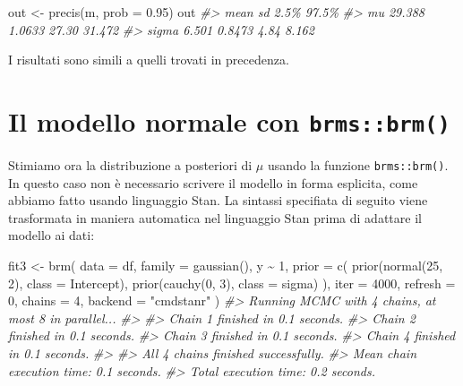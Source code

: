 \documentclass[
  11pt,
]{krantz}
\makeatletter
\newenvironment{Shaded}{\begin{snugshade}}{\end{snugshade}}
\newcommand{\AttributeTok}[1]{\textcolor[rgb]{0.61,0.61,0.61}{#1}}
\newcommand{\CommentTok}[1]{\textcolor[rgb]{0.37,0.37,0.37}{\textit{#1}}}
\newcommand{\DecValTok}[1]{\textcolor[rgb]{0.06,0.06,0.06}{#1}}
\newcommand{\FloatTok}[1]{\textcolor[rgb]{0.06,0.06,0.06}{#1}}
\newcommand{\FunctionTok}[1]{\textcolor[rgb]{0,0,0}{#1}}
\newcommand{\NormalTok}[1]{#1}
\newcommand{\OtherTok}[1]{\textcolor[rgb]{0.37,0.37,0.37}{#1}}
\newcommand{\SpecialCharTok}[1]{\textcolor[rgb]{0,0,0}{#1}}
\newcommand{\StringTok}[1]{\textcolor[rgb]{0.5,0.5,0.5}{#1}}
\newenvironment{kframe}{%
\medskip{}
\setlength{\fboxsep}{.8em}
 \def\at@end@of@kframe{}%
 \ifinner\ifhmode%
  \def\at@end@of@kframe{\end{minipage}}%
  \begin{minipage}{\columnwidth}%
 \fi\fi%
 \def\FrameCommand##1{\hskip\@totalleftmargin \hskip-\fboxsep
 \colorbox{shadecolor}{##1}\hskip-\fboxsep
     \hskip-\linewidth \hskip-\@totalleftmargin \hskip\columnwidth}%
 \MakeFramed {\advance\hsize-\width
   \@totalleftmargin\z@ \linewidth\hsize
   \@setminipage}}%
 {\par\unskip\endMakeFramed%
 \at@end@of@kframe}
\renewenvironment{Shaded}{\begin{kframe}}{\end{kframe}}
\theoremstyle{definition}
\theoremstyle{definition}
\theoremstyle{definition}
\theoremstyle{definition}
\theoremstyle{remark}
\makeatother
\begin{document}
\begin{Shaded}
\begin{Highlighting}[]
\NormalTok{out }\OtherTok{\textless{}{-}} \FunctionTok{precis}\NormalTok{(m, }\AttributeTok{prob =} \FloatTok{0.95}\NormalTok{)}
\NormalTok{out}
\CommentTok{\#\textgreater{}         mean     sd  2.5\%  97.5\%}
\CommentTok{\#\textgreater{} mu    29.388 1.0633 27.30 31.472}
\CommentTok{\#\textgreater{} sigma  6.501 0.8473  4.84  8.162}
\end{Highlighting}
\end{Shaded}

I risultati sono simili a quelli trovati in precedenza.

\hypertarget{il-modello-normale-con-brmsbrm}{%
\section{\texorpdfstring{Il modello normale con \texttt{brms::brm()}}{Il modello normale con brms::brm()}}\label{il-modello-normale-con-brmsbrm}}

Stimiamo ora la distribuzione a posteriori di \(\mu\) usando la funzione \texttt{brms::brm()}. In questo caso non è necessario scrivere il modello in forma esplicita, come abbiamo fatto usando linguaggio Stan. La sintassi specifiata di seguito viene trasformata in maniera automatica nel linguaggio Stan prima di adattare il modello ai dati:

\begin{Shaded}
\begin{Highlighting}[]
\NormalTok{fit3 }\OtherTok{\textless{}{-}} \FunctionTok{brm}\NormalTok{(}
  \AttributeTok{data =}\NormalTok{ df, }
  \AttributeTok{family =} \FunctionTok{gaussian}\NormalTok{(),}
\NormalTok{  y }\SpecialCharTok{\textasciitilde{}} \DecValTok{1}\NormalTok{,}
  \AttributeTok{prior =} \FunctionTok{c}\NormalTok{(}
    \FunctionTok{prior}\NormalTok{(}\FunctionTok{normal}\NormalTok{(}\DecValTok{25}\NormalTok{, }\DecValTok{2}\NormalTok{), }\AttributeTok{class =}\NormalTok{ Intercept),}
    \FunctionTok{prior}\NormalTok{(}\FunctionTok{cauchy}\NormalTok{(}\DecValTok{0}\NormalTok{, }\DecValTok{3}\NormalTok{), }\AttributeTok{class =}\NormalTok{ sigma)}
\NormalTok{  ),}
  \AttributeTok{iter =} \DecValTok{4000}\NormalTok{, }
  \AttributeTok{refresh =} \DecValTok{0}\NormalTok{, }
  \AttributeTok{chains =} \DecValTok{4}\NormalTok{,}
  \AttributeTok{backend =} \StringTok{"cmdstanr"}
\NormalTok{)}
\CommentTok{\#\textgreater{} Running MCMC with 4 chains, at most 8 in parallel...}
\CommentTok{\#\textgreater{} }
\CommentTok{\#\textgreater{} Chain 1 finished in 0.1 seconds.}
\CommentTok{\#\textgreater{} Chain 2 finished in 0.1 seconds.}
\CommentTok{\#\textgreater{} Chain 3 finished in 0.1 seconds.}
\CommentTok{\#\textgreater{} Chain 4 finished in 0.1 seconds.}
\CommentTok{\#\textgreater{} }
\CommentTok{\#\textgreater{} All 4 chains finished successfully.}
\CommentTok{\#\textgreater{} Mean chain execution time: 0.1 seconds.}
\CommentTok{\#\textgreater{} Total execution time: 0.2 seconds.}
\end{Highlighting}
\end{Shaded}
\end{document}
